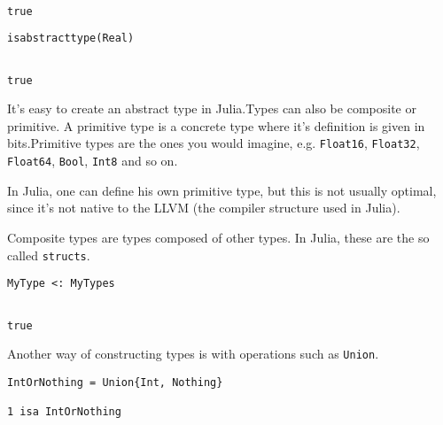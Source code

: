 \begingroup

\fontsize{10pt}{12pt}\selectfont

\begin{verbatim}

true
\end{verbatim}

\endgroup

\bigskip
\begin{lstlisting}[language=JuliaLocal, style=julia, texcl=true]
isabstracttype(Real)
\end{lstlisting}

\begingroup

\fontsize{10pt}{12pt}\selectfont

\begin{verbatim}

true
\end{verbatim}

\endgroup
It's easy to create an abstract type in Julia.Types can also be composite or primitive. A primitive type is a concrete type where it's definition is given in bits.Primitive types are the ones you would imagine, e.g. \lstinline[style=julia]{Float16}, \lstinline[style=julia]{Float32}, \lstinline[style=julia]{Float64}, \lstinline[style=julia]{Bool}, \lstinline[style=julia]{Int8} and so on.

In Julia, one can define his own primitive type, but this is not usually optimal, since it's not native to the LLVM (the compiler structure used in Julia).

Composite types are types composed of other types. In Julia, these are the so called \lstinline[style=julia]{structs}.
\bigskip
\begin{lstlisting}[language=JuliaLocal, style=julia, texcl=true]
MyType <: MyTypes
\end{lstlisting}

\begingroup

\fontsize{10pt}{12pt}\selectfont

\begin{verbatim}

true
\end{verbatim}

\endgroup
Another way of constructing types is with operations such as \lstinline[style=julia]{Union}.
\bigskip
\begin{lstlisting}[language=JuliaLocal, style=julia, texcl=true]
IntOrNothing = Union{Int, Nothing}

1 isa IntOrNothing
\end{lstlisting}

